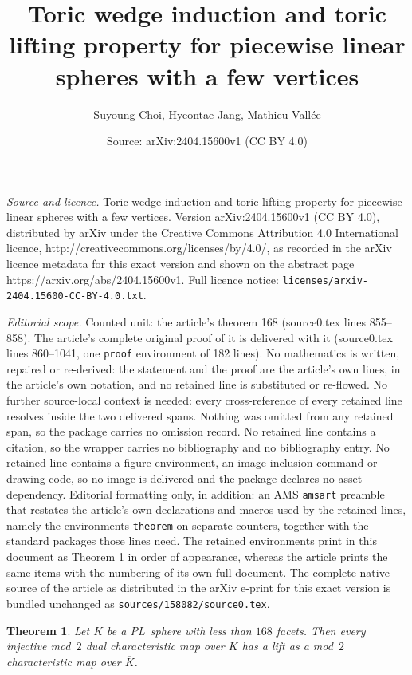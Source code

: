 \documentclass[10pt,a4paper]{amsart}
\title{Toric wedge induction and toric lifting property for piecewise linear spheres with a few vertices}
\author{Suyoung Choi, Hyeontae Jang, Mathieu Vall\'ee}
\date{Source: arXiv:2404.15600v1 (CC BY 4.0)}
\newtheorem{theorem}{Theorem}
\begin{document}
\maketitle

\noindent\emph{Source and licence.} Toric wedge induction and toric lifting property for piecewise linear spheres with a few vertices. Version arXiv:2404.15600v1 (CC BY 4.0), distributed by arXiv under the Creative Commons Attribution 4.0 International licence, http://creativecommons.org/licenses/by/4.0/, as recorded in the arXiv licence metadata for this exact version and shown on the abstract page https://arxiv.org/abs/2404.15600v1. Full licence notice: \texttt{licenses/arxiv-2404.15600-CC-BY-4.0.txt}.\par\smallskip

\noindent\textit{Editorial scope.} Counted unit: the article's theorem 168 (source0.tex lines 855--858). The article's complete original proof of it is delivered with it (source0.tex lines 860--1041, one \texttt{proof} environment of 182 lines). No mathematics is written, repaired or re-derived: the statement and the proof are the article's own lines, in the article's own notation, and no retained line is substituted or re-flowed.  No further source-local context is needed: every cross-reference of every retained line resolves inside the two delivered spans.  Nothing was omitted from any retained span, so the package carries no omission record.  No retained line contains a citation, so the wrapper carries no bibliography and no bibliography entry.  No retained line contains a figure environment, an image-inclusion command or drawing code, so no image is delivered and the package declares no asset dependency.  Editorial formatting only, in addition: an AMS \texttt{amsart} preamble that restates the article's own declarations and macros used by the retained lines, namely the environments \texttt{theorem} on separate counters, together with the standard packages those lines need.  The retained environments print in this document as Theorem 1 in order of appearance, whereas the article prints the same items with the numbering of its own full document.  The complete native source of the article as distributed in the arXiv e-print for this exact version is bundled unchanged as \texttt{sources/158082/source0.tex}.
\begin{theorem} \label{theorem: 168}
    Let $K$ be a PL~sphere with less than $168$ facets.
    Then every injective mod~$2$ dual characteristic map over $K$ has a lift as a mod~$2$ characteristic map over $\overline{K}$.
\end{theorem}
\end{document}
